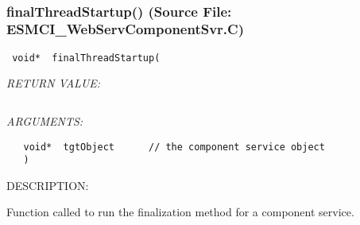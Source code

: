 \mbox{}\hrulefill\
 
\subsubsection{finalThreadStartup() (Source File: ESMCI\_WebServComponentSvr.C)}


  
\begin{verbatim} void*  finalThreadStartup(\end{verbatim}{\em RETURN VALUE:}
\begin{verbatim} \end{verbatim}{\em ARGUMENTS:}
\begin{verbatim}   void*  tgtObject      // the component service object
   )\end{verbatim}
{\sf DESCRIPTION:\\ }


      Function called to run the finalization method for a component service.
  
\setlength{\parskip}{\oldparskip}
\setlength{\parindent}{\oldparindent}
\setlength{\baselineskip}{\oldbaselineskip}
